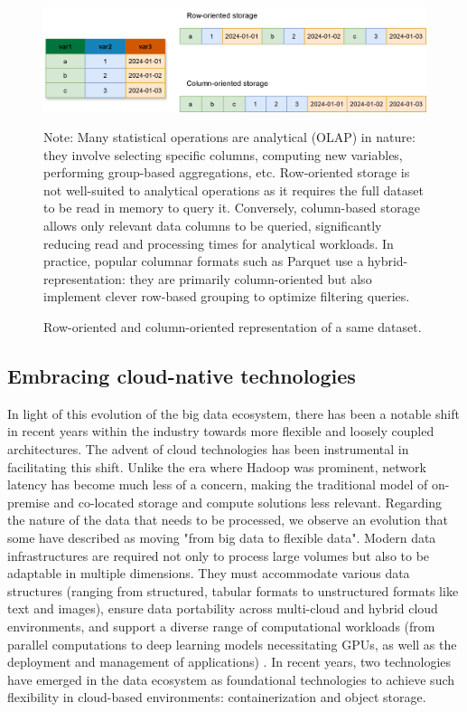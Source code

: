 \documentclass[graybox]{svmult}
\begin{document}
\begin{figure}[htbp]
    \includegraphics[width=\linewidth]{figures/columnar-storage.png}
    \caption{Row-oriented and column-oriented representation of a same dataset.}
    \label{fig:columnar-storage}
    \medskip
    {\footnotesize Note: Many statistical operations are analytical (OLAP) in nature: they involve selecting specific columns, computing new variables, performing group-based aggregations, etc. Row-oriented storage is not well-suited to analytical operations as it requires the full dataset to be read in memory to query it. Conversely, column-based storage allows only relevant data columns to be queried, significantly reducing read and processing times for analytical workloads. In practice, popular columnar formats such as Parquet use a hybrid-representation: they are primarily column-oriented but also implement clever row-based grouping to optimize filtering queries.}
\end{figure}

\subsection{Embracing cloud-native technologies}
\label{sec:cloud-native}

In light of this evolution of the big data ecosystem, there has been a notable shift in recent years within the industry towards more flexible and loosely coupled architectures. The advent of cloud technologies has been instrumental in facilitating this shift. Unlike the era where Hadoop was prominent, network latency has become much less of a concern, making the traditional model of on-premise and co-located storage and compute solutions less relevant. Regarding the nature of the data that needs to be processed, we observe an evolution that some have described as moving "from big data to flexible data". Modern data infrastructures are required not only to process large volumes but also to be adaptable in multiple dimensions. They must accommodate various data structures (ranging from structured, tabular formats to unstructured formats like text and images), ensure data portability across multi-cloud and hybrid cloud environments, and support a diverse range of computational workloads (from parallel computations to deep learning models necessitating GPUs, as well as the deployment and management of applications) \citep{li2020big}. In recent years, two technologies have emerged in the data ecosystem as foundational technologies to achieve such flexibility in cloud-based environments: containerization and object storage. 
\end{document}
